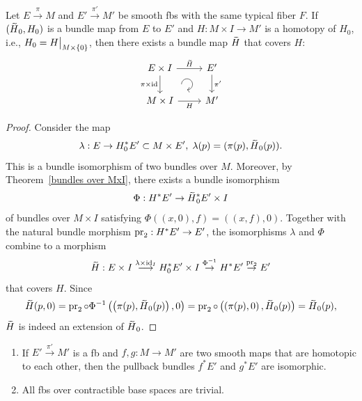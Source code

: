 \begin{thm}\label{HLP}
    Let $E\overset{\pi}{\to}M$ and $E'\overset{\pi'}{\to}M'$ be smooth \glspl{fb} with the same typical fiber $F$. If $(\wt{H}_0,H_0)$ is a bundle map from $E$ to $E'$ and $H:M\times I\to M'$ is a homotopy of $H_0$, i.e., $H_0=\restr{H}{M\times\{0\}}$, then there exists a bundle map $\wt{H}$ that covers $H$:
    \[\begin{tikzcd}[every matrix/.append style={name=m}, execute at end picture={\draw [<-] ([xshift=-9mm,yshift=1mm]m-2-2.north) arc[start angle=-90,delta angle=270,radius=0.2cm];}]
    E\times I \arrow[r,"\wt{H}"]\arrow[d,swap,"\pi\times\id"]& E'\arrow[d,"\pi'"] \\
    M\times I\arrow[r,swap,"H"]& M'
    \end{tikzcd}\]
\end{thm}
\begin{proof}
    Consider the map
    \[
    \lambda:E\to H_0^\ast E'\subset M\times E',\; \lambda(p)=(\pi(p),\wt{H}_0(p)).
    \]
    This is a bundle isomorphism of two bundles over $M$. Moreover, by Theorem~\ref{bundles over MxI}, there exists a bundle isomorphism 
    \[
    \Phi:H^\ast E'\to \wt{H}_0^\ast E'\times I
    \]
    of bundles over $M\times I$ satisfying $\Phi\left((x,0),f\right)=\left((x,f),0\right)$. Together with the natural bundle morphism $\operatorname{pr}_2:H^\ast E'\to E'$, the isomorphisms $\lambda $ and $\Phi$ combine to a morphism
    \[
    \wt{H}:E\times I\overset{\lambda\times\id_I}{\longrightarrow}H_0^\ast E' \times I\overset{\Phi^{-1}}{\to}H^\ast E'\overset{\pr_2}{\to}E'
    \]
    that covers $H$. Since 
    \[
    \wt{H}(p,0)=\pr_2\circ\Phi^{-1}\left(\left(\pi(p),\wt{H}_0(p)\right),0\right)=\pr_2\circ \left(\left(\pi(p),0\right),\wt{H}_0(p)\right)=\wt{H}_0(p),
    \]
    $\wt{H}$ is indeed an extension of $\wt{H}_0$.
\end{proof}




\begin{cor}\label{HLP cor}
\begin{enumerate}
    \item If $E'\overset{\pi'}{\to}M'$ is a \gls{fb} and $f,g:M\to M'$ are two smooth maps that are homotopic to each other, then the pullback bundles $f^\ast E'$ and $g^\ast E'$ are isomorphic.
    \item All \glspl{fb} over contractible base spaces are trivial.
\end{enumerate}
\end{cor}

